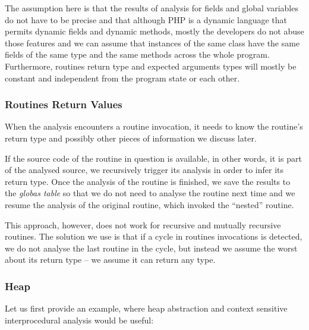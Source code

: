         The assumption here is that the results of analysis for fields 
        and global variables do not have to be precise and that although 
        PHP is a dynamic language that permits dynamic fields and dynamic 
        methods, mostly the developers do not abuse those features and 
        we can assume that instances of the same class have the same 
        fields of the same type and the same methods across the whole 
        program. Furthermore, routines return type and expected 
        arguments types will mostly be constant and independent 
        from the program state or each other.
        
        \subsubsection*{Routines Return Values}
        When the analysis encounters a routine invocation, it needs 
        to know the routine's return type and possibly other pieces 
        of information we discuss later.
        
        If the source code of the routine in question is available, 
        in other words, it is part of the analysed source, we 
        recursively trigger its analysis in order to infer its 
        return type. Once the analysis of the routine 
        is finished, we save the results to the \emph{globas table} 
        so that we do not need to analyse the routine next time 
        and we resume the analysis of the original routine, 
        which invoked the ``nested'' routine.
        
        This approach, however, does not work for recursive 
        and mutually recursive routines. The solution we use 
        is that if a cycle in routines invocations is detected, 
        we do not analyse the last routine in the cycle, but 
        instead we assume the worst about its return type -- 
        we assume it can return any type.
        
        
        \subsubsection*{Heap}        
        Let us first provide an example, where heap abstraction and 
        context sensitive interprocedural analysis would be useful:
        
%
        
